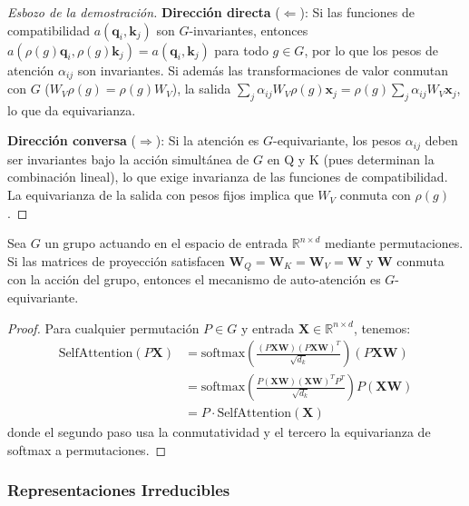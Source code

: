 \begin{proof}[Esbozo de la demostración]
\textbf{Dirección directa} ($\Leftarrow$): Si las funciones de compatibilidad $a(\mathbf{q}_i, \mathbf{k}_j)$ son $G$-invariantes, entonces $a(\rho(g)\mathbf{q}_i, \rho(g)\mathbf{k}_j) = a(\mathbf{q}_i, \mathbf{k}_j)$ para todo $g \in G$, por lo que los pesos de atención $\alpha_{ij}$ son invariantes. Si además las transformaciones de valor conmutan con $G$ ($W_V \rho(g) = \rho(g) W_V$), la salida $\sum_j \alpha_{ij} W_V \rho(g)\mathbf{x}_j = \rho(g) \sum_j \alpha_{ij} W_V \mathbf{x}_j$, lo que da equivarianza.

\textbf{Dirección conversa} ($\Rightarrow$): Si la atención es $G$-equivariante, los pesos $\alpha_{ij}$ deben ser invariantes bajo la acción simultánea de $G$ en Q y K (pues determinan la combinación lineal), lo que exige invarianza de las funciones de compatibilidad. La equivarianza de la salida con pesos fijos implica que $W_V$ conmuta con $\rho(g)$.
\end{proof}

\begin{lemma}\label{lemma:self_attention_equivariance}
Sea $G$ un grupo actuando en el espacio de entrada $\mathbb{R}^{n \times d}$ mediante permutaciones. 
Si las matrices de proyección satisfacen $\mathbf{W}_Q = \mathbf{W}_K = \mathbf{W}_V = \mathbf{W}$ 
y $\mathbf{W}$ conmuta con la acción del grupo, entonces el mecanismo de auto-atención 
es $G$-equivariante.
\end{lemma}

\begin{proof}
Para cualquier permutación $P \in G$ y entrada $\mathbf{X} \in \mathbb{R}^{n \times d}$, tenemos:
\begin{align}
\text{SelfAttention}(P\mathbf{X}) &= \text{softmax}\left(\frac{(P\mathbf{X}\mathbf{W})(P\mathbf{X}\mathbf{W})^T}{\sqrt{d_k}}\right)(P\mathbf{X}\mathbf{W}) \\
&= \text{softmax}\left(\frac{P(\mathbf{X}\mathbf{W})(\mathbf{X}\mathbf{W})^T P^T}{\sqrt{d_k}}\right)P(\mathbf{X}\mathbf{W}) \\
&= P \cdot \text{SelfAttention}(\mathbf{X})
\end{align}
donde el segundo paso usa la conmutatividad y el tercero la equivarianza de softmax a permutaciones.
\end{proof}

\subsubsection{Representaciones Irreducibles}

